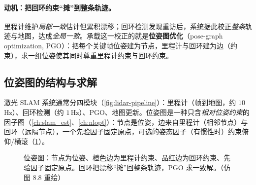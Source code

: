 \paragraph{动机：把回环约束“摊”到整条轨迹。}
里程计维护\emph{局部一致}估计但累积漂移；回环检测发现重访后，系统据此校正\emph{整条}轨迹与地图，达成\emph{全局一致}\cite{carlone2026handbook}。承载这一校正的就是\textbf{位姿图优化}（pose-graph optimization, PGO）：把每个关键帧位姿建为节点，里程计与回环建为边（约束），求一组位姿使其同时尊重里程计约束与回环约束。

\subsection{位姿图的结构与求解}
\label{sec:lidar-pgo}

激光 SLAM 系统通常分四模块（\cref{fig:lidar-pipeline}）\cite{carlone2026handbook}：里程计（帧到地图，约 $10$\,Hz）、回环检测（约 $1$\,Hz）、PGO、地图更新。位姿图是一种只含\emph{相对位姿约束}的因子图（\cref{ch:slam_est}、\cref{ch:nlopt}）：节点是位姿，边来自里程计（相邻节点）与回环（远隔节点），一个先验因子固定原点，可选的姿态因子（有惯性时）约束俯仰/横滚（\cref{fig:lidar-posegraph}）。

\begin{figure}[ht]
\centering
{}
\caption{位姿图：节点为位姿、橙色边为里程计约束、品红边为回环约束、先验因子固定原点。回环把漂移“摊”回整条轨迹，PGO 求一致解。（仿 \cite{carlone2026handbook} 图 8.8 重绘）}
\label{fig:lidar-posegraph}
\end{figure}

